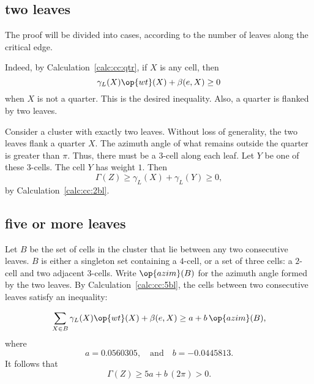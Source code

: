 \subsection{two leaves}

The proof will be divided into cases, according to the number of
leaves along the critical edge.

 Indeed, by
Calculation~\ref{calc:cc:qtr}, if $X$ is any cell,
then %
\begin{displaymath}
\gamma_L(X) \op{wt}(X) + \beta(e,X)\ge 0
\end{displaymath} 
when $X$ is not a quarter.  This is the desired inequality.  Also, a
quarter is flanked by two leaves.

Consider a cluster with exactly two leaves.
Without loss of generality, the two leaves flank a quarter
$X$. 
The azimuth angle of what remains outside the quarter
is greater than $\pi$.  Thus, there must be a $3$-cell
along each leaf.  Let $Y$ be one of these $3$-cells.
The cell $Y$ has weight $1$.
Then 
\begin{equation}\label{eqn:34}
\Gamma(Z)\ge \gamma_L(X)+\gamma_L(Y)\ge 0,
\end{equation}
by Calculation~\ref{calc:cc:2bl}.
%
%




\subsection{five or more leaves}

Let $B$ be the set of cells in the cluster that lie between any two
consecutive leaves.  $B$ is either a singleton set containing a
$4$-cell, or a set of three cells: a $2$-cell and two adjacent
$3$-cells.  Write $\op{azim}(B)$ for the azimuth angle formed by the
two leaves.  By Calculation~\ref{calc:cc:5bl}, the cells between two
consecutive leaves satisfy an
inequality: %

\begin{displaymath}
\sum_{X\in B} \gamma_L(X)\op{wt}(X) + \beta(e,X) \ge a + b\,\op{azim}(B),
\end{displaymath}
where
\begin{displaymath}
a= 0.0560305, \quad\text{and}\quad  b= -0.0445813.
\end{displaymath}
It follows that
\begin{displaymath}
\Gamma(Z) \ge 5 a + b\, (2\pi) > 0.
\end{displaymath}

